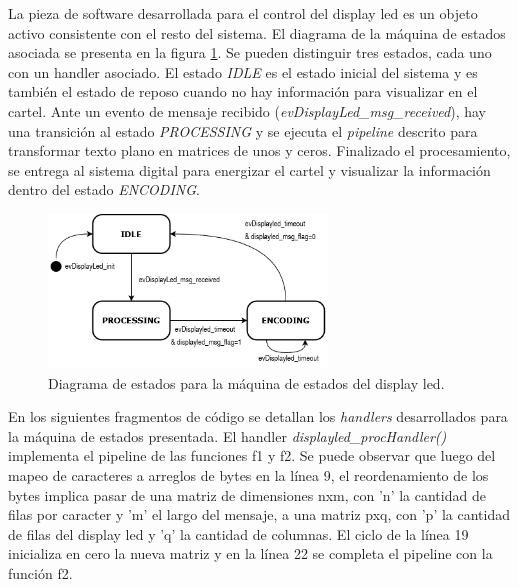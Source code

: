 La pieza de software desarrollada para el control del display led es un objeto activo consistente con el resto del sistema. El diagrama de la máquina de estados asociada se presenta en la figura \ref{fig:fsmDisplayled}. Se pueden distinguir tres estados, cada uno con un handler asociado. El estado \textit{IDLE} es el estado inicial del sistema y es también el estado de reposo cuando no hay información para visualizar en el cartel. Ante un evento de mensaje recibido (\textit{evDisplayLed\_msg\_received}), hay una transición al estado \textit{PROCESSING} y se ejecuta el \textit{pipeline} descrito para transformar texto plano en matrices de unos y ceros. Finalizado el procesamiento, se entrega al sistema digital para energizar el cartel y visualizar la información dentro del estado \textit{ENCODING}.\\

\begin{figure}[htbp]
	\centering
	\includegraphics[width=0.66\textwidth]{./Figures/FSMdisplayled.png}
	\caption{Diagrama de estados para la máquina de estados del display led.}
	\label{fig:fsmDisplayled}
\end{figure}

En los siguientes fragmentos de código se detallan los \textit{handlers} desarrollados para la máquina de estados presentada. El handler \textit{displayled\_procHandler()} implementa el pipeline de las funciones f1 y f2. Se puede observar que luego del mapeo de caracteres a arreglos de bytes en la línea 9, el reordenamiento de los bytes implica pasar de una matriz de dimensiones nxm, con 'n' la cantidad de filas por caracter y 'm' el largo del mensaje, a una matriz pxq, con 'p' la cantidad de filas del display led y 'q' la cantidad de columnas. El ciclo de la línea 19 inicializa en cero la nueva matriz y en la línea 22 se completa el pipeline con la función f2.\\

